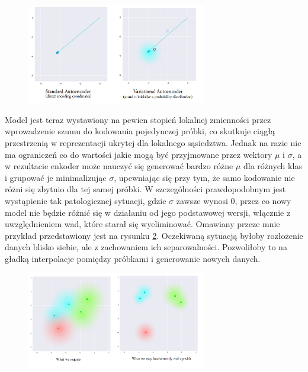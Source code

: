 \begin{figure}[h!]
    \centering
    \includegraphics[width=0.7\textwidth]{images/vae_vs_stand}
    \caption{}
    \label{fig:vae_vs_stand}
\end{figure}

Model jest teraz wystawiony na pewien stopień lokalnej zmienności przez wprowadzenie szumu do kodowania pojedynczej próbki, co skutkuje ciągłą przestrzenią w reprezentacji ukrytej dla lokalnego sąsiedztwa. Jednak na razie nie ma ograniczeń co do wartości jakie mogą być przyjmowane przez wektory $\mu$ i $\sigma$, a w rezultacie enkoder może nauczyć się generować bardzo różne $\mu$ dla różnych klas i grupować je minimalizując $\sigma$, upewniając się przy tym, że samo kodowanie nie różni się zbytnio dla tej samej próbki. W szczególności prawdopodobnym jest wystąpienie tak patologicznej sytuacji, gdzie $\sigma$ zawsze wynosi 0, przez co nowy model nie będzie różnić się w działaniu od jego podstawowej wersji, włącznie z uwzględnieniem wad, które starał się wyeliminować. Omawiany przeze mnie przykład przedstawiony jest na rysunku \ref{fig:vae_nolimits}. Oczekiwaną sytuacją byłoby rozłożenie danych blisko siebie, ale z zachowaniem ich separowalności. Pozwoliłoby to na gładką interpolacje pomiędzy próbkami i generowanie nowych danych.

\begin{figure}[h!]
    \centering
    \includegraphics[width=0.7\textwidth]{images/vae_nolimits}
    \caption{}
    \label{fig:vae_nolimits}
\end{figure}

